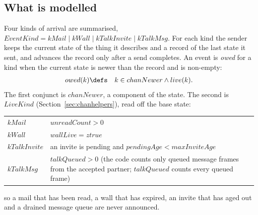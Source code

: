 \documentclass[a4paper,10pt,fleqn]{article}
\begin{document}
\subsection{What is modelled}

Four kinds of arrival are summarised, $EventKind = kMail \mid kWall \mid
kTalkInvite \mid kTalkMsg$.  For each kind the sender keeps the current
state of the thing it describes and a record of the last state it sent, and
advances the record only after a send completes.  An event is
\emph{owed} for a kind when the current state is newer than the record and
is non-empty:
\begin{eqnarray*}
  owed(k) & \defs & k \in chanNewer \land live(k).
\end{eqnarray*}
The first conjunct is $chanNewer$, a component of the state.  The second is
$LiveKind$ (Section~\ref{sec:chanhelpers}), read off the base state:
\begin{center}
\begin{tabular}{ll}
  $kMail$ & $unreadCount > 0$ \\
  $kWall$ & $wallLive = ztrue$ \\
  $kTalkInvite$ & an invite is pending and $pendingAge < maxInviteAge$ \\
  $kTalkMsg$ & $talkQueued > 0$ (the code counts only queued message frames
    from the accepted partner; $talkQueued$ counts every queued frame) \\
\end{tabular}
\end{center}
so a mail that has been read, a wall that has expired, an invite that has
aged out and a drained message queue are never announced.
\end{document}

